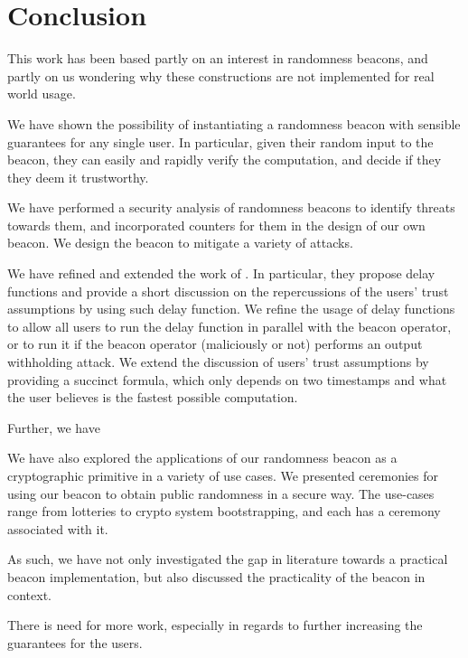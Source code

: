 \section{Conclusion}%
\label{sec:conclusion}

This work has been based partly on an interest in randomness beacons, and partly on us wondering why these constructions are not implemented for real world usage.

We have shown the possibility of instantiating a randomness beacon with sensible guarantees for any single user. In particular, given their random input to the beacon, they can easily and rapidly verify the computation, and decide if they they deem it trustworthy.

We have performed a security analysis of randomness beacons to identify threats towards them, and incorporated counters for them in the design of our own beacon. We design the beacon to mitigate a variety of attacks.

We have refined and extended the work of \citet{randomzoo}.
In particular, they propose delay functions and provide a short discussion on the repercussions of the users' trust assumptions by using such delay function.
We refine the usage of delay functions to allow all users to run the delay function in parallel with the beacon operator, or to run it if the beacon operator (maliciously or not) performs an output withholding attack.
We extend the discussion of users' trust assumptions by providing a succinct formula, which only depends on two timestamps and what the user believes is the fastest possible computation.

Further, we have 

We have also explored the applications of our randomness beacon as a cryptographic primitive in a variety of use cases. We presented ceremonies for using our beacon to obtain public randomness in a secure way. The use-cases range from lotteries to crypto system bootstrapping, and each has a ceremony associated with it.

As such, we have not only investigated the gap in literature towards a practical beacon implementation, but also discussed the practicality of the beacon in context.



There is need for more work, especially in regards to further increasing the guarantees for the users.


